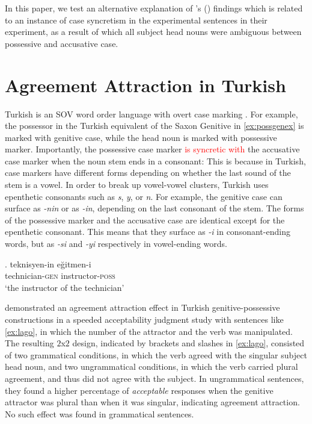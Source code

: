 \documentclass[apacite,linguex]{glossa}\usepackage[]{graphicx}\usepackage[]{color}
\newcommand{\revise}[1]{\textcolor{red}{#1}}
\begin{document}
In this paper, we test an alternative explanation of \citeauthor{LagoEtAl:2019}'s (\citeyear{LagoEtAl:2019}) findings which is related to an instance of case syncretism in the experimental sentences in their experiment, as a result of which all subject head nouns were ambiguous between possessive and accusative case.


\section{Agreement Attraction in Turkish}

Turkish is an SOV word order language with overt case marking \citep{GokselKerslake:2005,Kornfilt:2011,Kornfilt:2013}. For example, the possessor in the Turkish equivalent of the Saxon Genitive in \ref{ex:possgenex} is marked with genitive case, while the head noun is marked with possessive marker. 
Importantly, the possessive case marker \revise{is syncretic with} the accusative case marker when the noun stem ends in a consonant: 
This is because in Turkish, case markers have different forms depending on whether the last sound of the stem is a vowel. In order to break up vowel-vowel clusters, Turkish uses epenthetic consonants such as \textit{s}, \textit{y}, or \textit{n}.  For example, the genitive case can surface as \textit{-nin} or as \textit{-in}, depending on the last consonant of the stem. The forms of the possessive marker and the accusative case are identical except for the epenthetic consonant. This means that they surface as \textit{-i} in consonant-ending words, but as \textit{-si} and \textit{-yi} respectively in vowel-ending words. 

\ex. \label{ex:possgenex}
\gll teknisyen-in e\u{g}itmen-i \\
    technician-\textsc{gen} instructor-\textsc{poss} \\
\glt `the instructor of the technician'


\citet{LagoEtAl:2019} demonstrated an agreement attraction effect in Turkish genitive-possessive constructions in a speeded acceptability judgment study with sentences like \ref{ex:lago}, in which the number of the attractor and the verb was manipulated. The resulting $2$x$2$ design, indicated by brackets and slashes in \ref{ex:lago}, consisted of two grammatical conditions, in which the verb agreed with the singular subject head noun, and two ungrammatical conditions, in which the verb carried plural agreement, and thus did not agree with the subject. In ungrammatical sentences, they found a higher percentage of \textit{acceptable} responses when the genitive attractor was plural than when it was singular, indicating agreement attraction. No such effect was found in grammatical sentences.
\end{document}
